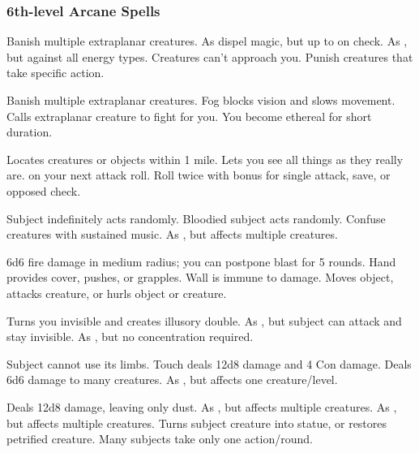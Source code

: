 \subsubsection{6th-level Arcane Spells} 
\begin{swspelllist}
     Banish multiple extraplanar creatures. 
     As dispel magic, but up to  on check.
     As , but against all energy types.
     Creatures can't approach you.
     Punish creatures that take specific action.

     Banish multiple extraplanar creatures. 
     Fog blocks vision and slows movement.
     Calls extraplanar creature to fight for you.
     You become ethereal for short duration.

     Locates creatures or objects within 1 mile.
    \M Lets you see all things as they really are.
      on your next attack roll.
     Roll twice with bonus for single attack, save, or opposed check.

     Subject indefinitely acts randomly.
     Bloodied subject acts randomly.
     Confuse creatures with sustained music.
     As , but affects multiple creatures.

     6d6 fire damage in medium radius; you can postpone blast for 5 rounds.
     Hand provides cover, pushes, or grapples.
     Wall is immune to damage.
     Moves object, attacks creature, or hurls object or creature.

     Turns you invisible and creates illusory double.
     As , but subject can attack and stay invisible.
     As , but no concentration required.

     Subject cannot use its limbs. 
     Touch deals 12d8 damage and 4 Con damage.
     Deals 6d6 damage to many creatures.
     As , but affects one creature/level.

     Deals 12d8 damage, leaving only dust.
     As , but affects multiple creatures.
     As , but affects multiple creatures.
     Turns subject creature into statue, or restores petrified creature.
     Many subjects take only one action/round.
\end{swspelllist}

